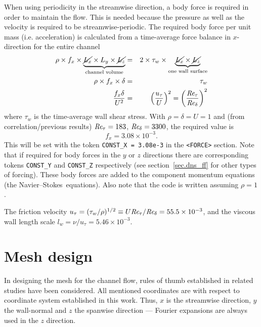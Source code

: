 \documentclass[11pt]{report}
\def\Rey{\mbox{\it Re}}                             %
\newcommand\NavSto{Navier--Stokes}
\begin{document}
When using periodicity in the streamwise direction, a body force is
required in order to maintain the flow.  This is needed because the
pressure as well as the velocity is required to be
streamwise-periodic. The required body force per unit mass
(i.e. acceleration) is calculated from a time-average force balance in
$x$-direction for the entire channel
\begin{eqnarray*}
 \rho \times f_x \times
  \underbrace{\cancel{L_x} \times L_y \times \cancel{L_z}}_{\text{channel
    volume}}  &=& 2 \times \tau_w \times \underbrace{\cancel{L_x} \times
    \cancel{L_z}}_{\text{one wall surface}} \\ 
   \rho \times f_x \times \delta & = & \tau_w\\
    \frac{f_x\delta}{U^2} & = & \left(\frac{u_\tau}{U}\right)^2 = 
    \left(\frac{\Rey_\tau}{\Rey_\delta}\right)^2
  \label{eq:force_balance}
\end{eqnarray*}
where $\tau_w$ is the time-average wall shear stress.  With $\rho =
\delta = U= 1$ and (from correlation/previous results)
$\Rey_\tau=183$, $\Rey_\delta=3300$, the required value is
\[
  f_x = 3.08 \times 10^{-3} .
\]
This will be set with the token \texttt{CONST\_X = 3.08e-3} in the 
\texttt{<FORCE>} section.  Note that if
required for body forces in the $y$ or $z$ directions there are
corresponding tokens \texttt{CONST\_Y} and \texttt{CONST\_Z} respectively 
(see section~\ref{sec.dns_ff} for other types of forcing).
These body forces are added to the component momentum equations (the
\NavSto\ equations).  Also note that the code is written assuming
$\rho=1$.

The friction velocity $u_\tau=(\tau_w/\rho)^{1/2}\equiv
U\Rey_\tau/\Rey_\delta=55.5\times10^{-3}$, and the viscous wall length
scale $l_w=\nu/u_\tau=5.46\times10^{-3}$.

\section{Mesh design}
\label{sec.meshdesign}

In designing the mesh for the channel flow, rules of thumb established
in related studies \citep{pio97,kmm87,blsc03} have been
considered. All mentioned coordinates are with respect to coordinate
system established in this work. Thus, $x$ is the streamwise
direction, $y$ the wall-normal and $z$ the spanwise direction ---
Fourier expansions are always used in the $z$ direction.
\end{document}
